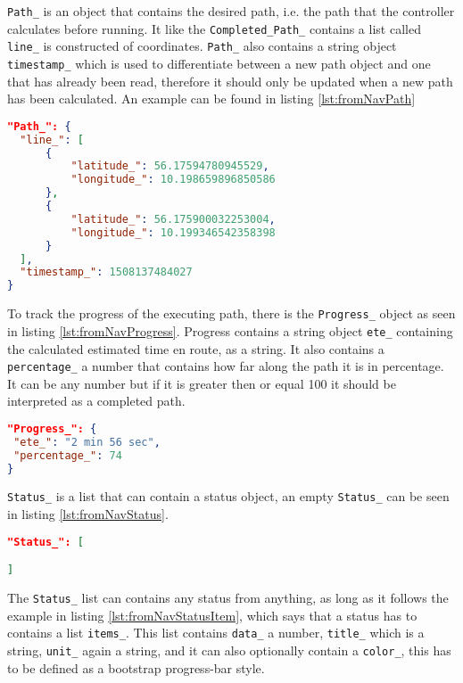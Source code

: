 \texttt{Path_} is an object that contains the desired path, i.e. the path that the controller calculates before running. It like the \texttt{Completed_Path_} contains a list called \texttt{line_} is constructed of coordinates. \texttt{Path_} also contains a string object \texttt{timestamp_} which is used to differentiate between a new path object and one that has already been read, therefore it should only be updated when a new path has been calculated. An example can be found in listing \ref{lst:fromNavPath}

\begin{lstlisting}[caption = {Example of a Path_ object in fromNav.JSON}, captionpos=b, label={lst:fromNavPath}, language=json,firstnumber=1]
"Path_": {
  "line_": [
      {
          "latitude_": 56.17594780945529,
          "longitude_": 10.198659896850586
      },
      {
          "latitude_": 56.175900032253004,
          "longitude_": 10.199346542358398
      }
  ],
  "timestamp_": 1508137484027
}
\end{lstlisting}

To track the progress of the executing path, there is the \texttt{Progress_} object as seen in listing \ref{lst:fromNavProgress}.
Progress contains a string object \texttt{ete_} containing the calculated estimated time en route, as a string. It also contains a \texttt{percentage_} a number that contains how far along the path it is in percentage. It can be any number but if it is greater then or equal 100 it should be interpreted as a completed path.

\begin{lstlisting}[caption = {Example of a Progress_ object in fromNav.JSON}, captionpos=b, label={lst:fromNavProgress}, language=json,firstnumber=1]
"Progress_": {
 "ete_": "2 min 56 sec",
 "percentage_": 74
}
\end{lstlisting}

\texttt{Status_} is a list that can contain a status object, an empty \texttt{Status_} can be seen in listing \ref{lst:fromNavStatus}.

\begin{lstlisting}[caption = {Example of a empty Status_ object in fromNav.JSON}, captionpos=b, label={lst:fromNavStatus}, language=json,firstnumber=1]
"Status_": [

]
\end{lstlisting}

The \texttt{Status_} list can contains any status from anything, as long as it follows the example in listing \ref{lst:fromNavStatusItem}, which says that a status has to contains a list \texttt{items_}. This list contains \texttt{data_} a number, \texttt{title_} which is a string, \texttt{unit_} again a string, and it can also optionally contain a \texttt{color_}, this has to be defined as a bootstrap progress-bar style.

